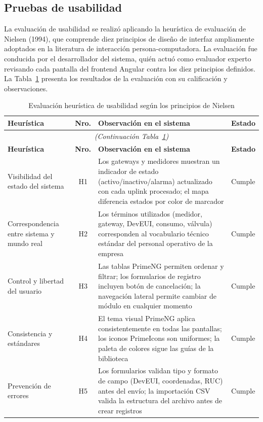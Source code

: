 \documentclass[12pt,a4paper,oneside]{report}
\begin{document}
\subsection{Pruebas de usabilidad}\label{subsec:usabilidad}

La evaluación de usabilidad se realizó aplicando la heurística de evaluación de Nielsen (1994), que comprende diez principios de diseño de interfaz ampliamente adoptados en la literatura de interacción persona-computadora. La evaluación fue conducida por el desarrollador del sistema, quién actuó como evaluador experto revisando cada pantalla del frontend Angular contra los diez principios definidos. La Tabla~\ref{tab:nielsen} presenta los resultados de la evaluación con su calificación y observaciones.

\begin{longtable}{p{3.5cm}cp{6.5cm}l}
\caption{Evaluación heurística de usabilidad según los principios de Nielsen}\label{tab:nielsen} \\
\toprule
\textbf{Heurística} & \textbf{Nro.} & \textbf{Observación en el sistema} & \textbf{Estado} \\
\midrule
\endfirsthead
\multicolumn{4}{c}{\textit{(Continuación Tabla~\ref{tab:nielsen})}} \\
\toprule
\textbf{Heurística} & \textbf{Nro.} & \textbf{Observación en el sistema} & \textbf{Estado} \\
\midrule
\endhead
\bottomrule
\endlastfoot
Visibilidad del estado del sistema & H1 & Los gateways y medidores muestran un indicador de estado (activo/inactivo/alarma) actualizado con cada uplink procesado; el mapa diferencia estados por color de marcador & Cumple \\
Correspondencia entre sistema y mundo real & H2 & Los términos utilizados (medidor, gateway, DevEUI, consumo, válvula) corresponden al vocabulario técnico estándar del personal operativo de la empresa & Cumple \\
Control y libertad del usuario & H3 & Las tablas PrimeNG permiten ordenar y filtrar; los formularios de registro incluyen botón de cancelación; la navegación lateral permite cambiar de módulo en cualquier momento & Cumple \\
Consistencia y estándares & H4 & El tema visual PrimeNG aplica consistentemente en todas las pantallas; los iconos PrimeIcons son uniformes; la paleta de colores sigue las guías de la biblioteca & Cumple \\
Prevención de errores & H5 & Los formularios validan tipo y formato de campo (DevEUI, coordenadas, RUC) antes del envío; la importación CSV valida la estructura del archivo antes de crear registros & Cumple \\

\end{longtable}
\end{document}
